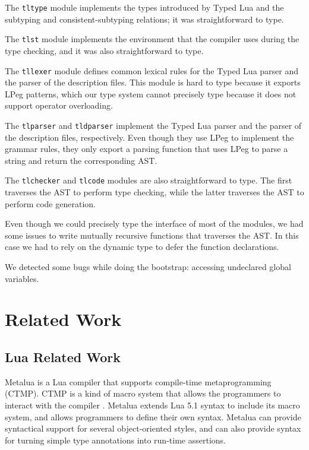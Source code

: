The \texttt{tltype} module implements the types introduced by
Typed Lua and the subtyping and consistent-subtyping relations;
it was straightforward to type.

The \texttt{tlst} module implements the environment that the
compiler uses during the type checking, and it was also straightforward
to type.

The \texttt{tllexer} module defines common lexical rules for
the Typed Lua parser and the parser of the description files.
This module is hard to type because it exports LPeg \citep{lpeg,ierusalimschy2009lpeg}
patterns, which our type system cannot precisely type because it does
not support operator overloading.

The \texttt{tlparser} and \texttt{tldparser} implement the Typed Lua
parser and the parser of the description files, respectively.
Even though they use LPeg to implement the grammar rules,
they only export a parsing function that uses LPeg to parse a
string and return the corresponding AST.

The \texttt{tlchecker} and \texttt{tlcode} modules are also
straightforward to type.
The first traverses the AST to perform type checking,
while the latter traverses the AST to perform code generation.

Even though we could precisely type the interface of most of
the modules, we had some issues to write mutually recursive
functions that traverses the AST.
In this case we had to rely on the dynamic type to defer the
function declarations.

We detected some bugs while doing the bootstrap:
accessing undeclared global variables.

\section{Related Work}
\label{sec:relatedwork}

\subsection{Lua Related Work}

Metalua \citep{metalua} is a Lua compiler that supports compile-time
metaprogramming (CTMP).
CTMP is a kind of macro system that allows the programmers to interact
with the compiler \citep{fleutot2007contrasting}. 
Metalua extends Lua 5.1 syntax to include its macro system,
and allows programmers to define their own syntax.
Metalua can provide syntactical support for several object-oriented
styles, and can also provide syntax for turning simple type
annotations into run-time assertions.

